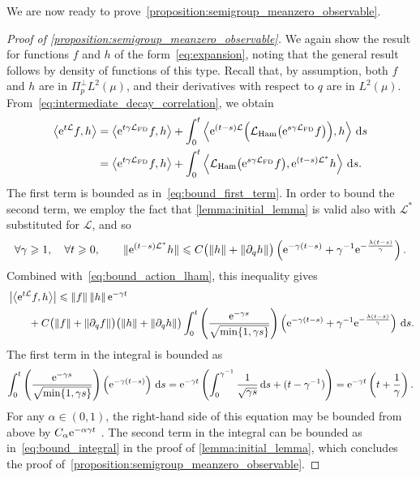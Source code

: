 \documentclass[11pt,a4paper]{article}
\begin{document}
We are now ready to prove~\cref{proposition:semigroup_meanzero_observable}.
\begin{proof}
    [Proof of \cref{proposition:semigroup_meanzero_observable}]
    We again show the result for functions $f$ and $h$ of the form~\eqref{eq:expansion},
    noting that the general result follows by density of functions of this type.
    Recall that, by assumption, both $f$ and $h$ are in $\Pi_{p}^\perp L^2(\mu)$,
    and their derivatives with respect to $q$ are in $L^2(\mu)$.
    From~\eqref{eq:intermediate_decay_correlation}, we obtain
    \begin{align}
        \notag
        \ip{\e^{t \mathcal L} f}{h}
        &= \ip{\e^{t \gamma \mathcal L_{\rm FD}} f}{h}
        + \int_{0}^t \ip{\e^{(t-s) \mathcal L} \Bigl( \mathcal L_{\rm Ham} \bigl(\e^{s \gamma \mathcal L_{\rm FD}} f\bigr) \Bigr)}{h} \, \d s \\
        &= \ip{\e^{t \gamma \mathcal L_{\rm FD}} f}{h}
        + \int_{0}^t \ip{ \mathcal L_{\rm Ham} \bigl(\e^{s \gamma \mathcal L_{\rm FD}} f\bigr) }{\e^{(t-s) \mathcal L^*}  h} \, \d s.
    \end{align}
    The first term is bounded as in~\eqref{eq:bound_first_term}.
    In order to bound the second term,
    we employ the fact that \cref{lemma:initial_lemma} is valid also with $\mathcal L^*$ substituted for $\mathcal L$,
    and so
    \[
        \forall \gamma \geq 1, \quad
        \forall t \geq 0, \qquad
        \norm*{\e^{(t-s)\mathcal L^*} h}
        \leq C \bigl( \norm{h} + \norm{\partial_q h} \bigr)
        \left( \e^{- \gamma (t-s)} + \gamma^{-1} \e^{-\frac{\lambda (t-s)}{\gamma}} \right).
    \]
    Combined with~\eqref{eq:bound_action_lham},
    this inequality gives
    \begin{align*}
        & \abs{ \ip{\e^{t \mathcal L} f}{h}}
        \leq \norm{f} \norm{h} \e^{-\gamma t} \\
        & \qquad + C \bigl( \norm{f} + \norm{\partial_q f} \bigr) \bigl( \norm{h} + \norm{\partial_q h} \bigr)
            \int_{0}^{t}  \left( \frac{\e^{-\gamma s}}{\sqrt{\min\{1, \gamma s\}}} \right)
         \left(  \e^{- \gamma (t-s)} + \gamma^{-1} \e^{-\frac{\lambda (t-s)}{\gamma}} \right) \, \d s.
    \end{align*}
    The first term in the integral is bounded as
    \[
        \int_{0}^{t}  \left( \frac{\mathrm{e}^{-\gamma s}}{\sqrt{\min\{1, \gamma s\}}} \right)
        \left(  \mathrm{e}^{- \gamma (t-s)} \right) \, \mathrm d s
        = \mathrm{e}^{- \gamma t} \left( \int_{0}^{\gamma^{-1}} \frac{1}{\sqrt{\gamma s}} \, \mathrm d s + (t - \gamma^{-1}) \right)
        = \mathrm{e}^{-\gamma t} \left( t + \frac{1}{\gamma} \right).
    \]
    For any $\alpha \in (0, 1)$, the right-hand side of this equation may be bounded from above by $C_{\alpha} \mathrm{e}^{- \alpha \gamma t}$ .
    The second term in the integral can be bounded as in~\eqref{eq:bound_integral} in the proof of \cref{lemma:initial_lemma},
    which concludes the proof of~\cref{proposition:semigroup_meanzero_observable}.
\end{proof}
\end{document}
